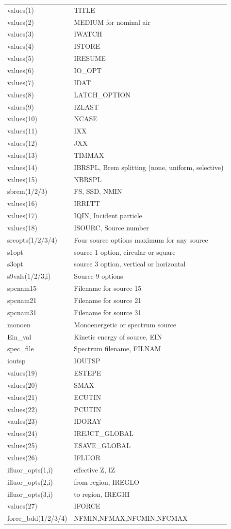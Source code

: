 \documentclass[12pt]{book}
\begin{document}
\begin{tabular}{|p{4.5cm}|p{11.5cm}|}\hline
values(1) & TITLE \\
values(2) & MEDIUM for nominal air \\
values(3) & IWATCH \\
values(4) & ISTORE \\
values(5) & IRESUME\\
values(6) & IO\_OPT\\
values(7) & IDAT\\
values(8) & LATCH\_OPTION\\
values(9) & IZLAST\\
values(10) & NCASE\\
values(11) & IXX\\
values(12) & JXX\\
values(13) & TIMMAX\\
values(14) & IBRSPL, Brem splitting (none, uniform, selective)\\
values(15) & NBRSPL\\
sbrem(1/2/3) & FS, SSD, NMIN\\
values(16) & IRRLTT\\
values(17) & IQIN, Incident particle\\
values(18) & ISOURC, Source number\\
srcopts(1/2/3/4) & Four source options maximum for any source\\
s1opt & source 1 option, circular or square \\
s3opt & source 3 option, vertical or horizontal \\
s9vals(1/2/3,i) & Source 9 options \\
spcnam15 & Filename for source 15\\
spcnam21 & Filename for source 21\\
spcnam31 & Filename for source 31\\
monoen  & Monoenergetic or spectrum source \\
Ein\_val & Kinetic energy of source, EIN\\
spec\_file & Spectrum filename, FILNAM \\
ioutsp & IOUTSP \\
values(19) & ESTEPE\\
values(20) & SMAX\\
values(21) & ECUTIN\\
values(22) & PCUTIN\\
vaules(23) & IDORAY\\
values(24) & IREJCT\_GLOBAL\\
values(25) & ESAVE\_GLOBAL\\
values(26) & IFLUOR\\
ifluor\_opts(1,i) & effective Z, IZ\\
ifluor\_opts(2,i) & from region, IREGLO\\
ifluor\_opts(3,i) & to region, IREGHI\\
values(27) & IFORCE\\
force\_bdd(1/2/3/4) & NFMIN,NFMAX,NFCMIN,NFCMAX\\
\hline\end{tabular}
\end{document}

